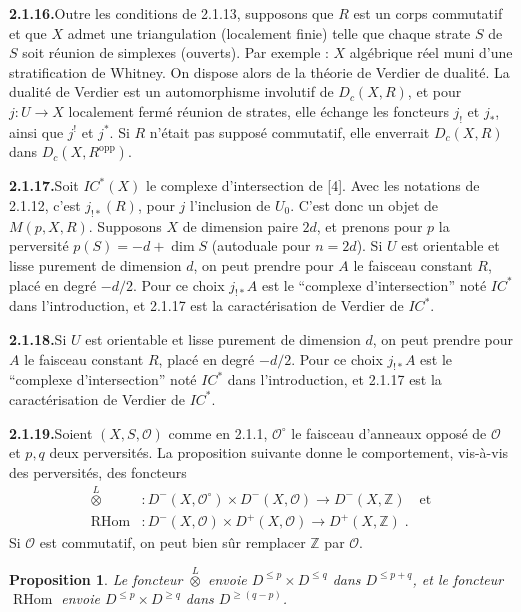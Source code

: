 \documentclass[12pt,a4paper]{article}
\theoremstyle{plain}
\newtheorem{proposition}[theorem]{Proposition}
\theoremstyle{definition}
\DeclareMathOperator{\RHom}{RHom}
\begin{document}
\smallskip
\noindent\textbf{2.1.16.}\quad Outre les conditions de 2.1.13, supposons que $R$ est un corps commutatif et que $X$ admet une triangulation (localement finie) telle que chaque strate $S$ de $S$ soit r\'eunion de simplexes (ouverts). Par exemple : $X$ alg\'ebrique r\'eel muni d'une stratification de Whitney. On dispose alors de la th\'eorie de Verdier de dualit\'e. La dualit\'e de Verdier est un automorphisme involutif de $D_c(X, R)$, et pour $j : U \to X$ localement ferm\'e r\'eunion de strates, elle \'echange les foncteurs $j_!$ et $j_*$, ainsi que $j^!$ et $j^*$. Si $R$ n'\'etait pas suppos\'e commutatif, elle enverrait $D_c(X, R)$ dans $D_c(X, R^{\mathrm{opp}})$.

\smallskip
\noindent\textbf{2.1.17.}\quad Soit $IC^*(X)$ le complexe d'intersection de [4]. Avec les notations de 2.1.12, c'est $j_{!*}(R)$, pour $j$ l'inclusion de $U_0$. C'est donc un objet de $M(p, X, R)$. Supposons $X$ de dimension paire $2d$, et prenons pour $p$ la perversit\'e $p(S) = -d + \dim S$ (autoduale pour $n = 2d$). Si $U$ est orientable et lisse purement de dimension $d$, on peut prendre pour $A$ le faisceau constant $R$, plac\'e en degr\'e $-d/2$. Pour ce choix $j_{!*} A$ est le ``complexe d'intersection'' not\'e $IC^*$ dans l'introduction, et 2.1.17 est la caract\'erisation de Verdier de $IC^*$.

\smallskip
\noindent\textbf{2.1.18.}\quad Si $U$ est orientable et lisse purement de dimension $d$, on peut prendre pour $A$ le faisceau constant $R$, plac\'e en degr\'e $-d/2$. Pour ce choix $j_{!*} A$ est le ``complexe d'intersection'' not\'e $IC^*$ dans l'introduction, et 2.1.17 est la caract\'erisation de Verdier de $IC^*$.

\smallskip
\noindent\textbf{2.1.19.}\quad Soient $(X, S, \mathcal{O})$ comme en 2.1.1, $\mathcal{O}^\circ$ le faisceau d'anneaux oppos\'e de $\mathcal{O}$ et $p, q$ deux perversit\'es. La proposition suivante donne le comportement, vis-\`a-vis des perversit\'es, des foncteurs
\begin{align*}
\overset{L}{\otimes} &: D^-(X, \mathcal{O}^\circ) \times D^-(X, \mathcal{O}) \to D^-(X, \mathbb{Z}) \quad\text{et}\\
\RHom &: D^-(X, \mathcal{O}) \times D^+(X, \mathcal{O}) \to D^+(X, \mathbb{Z})\;.
\end{align*}
Si $\mathcal{O}$ est commutatif, on peut bien s\^ur remplacer $\mathbb{Z}$ par $\mathcal{O}$.

\begin{proposition}\label{prop:2.1.20}
Le foncteur $\overset{L}{\otimes}$ envoie $D^{\leqslant p} \times D^{\leqslant q}$ dans $D^{\leqslant p+q}$, et le foncteur $\RHom$ envoie $D^{\leqslant p} \times D^{\geqslant q}$ dans $D^{\geqslant (q-p)}$.
\end{proposition}
\end{document}
